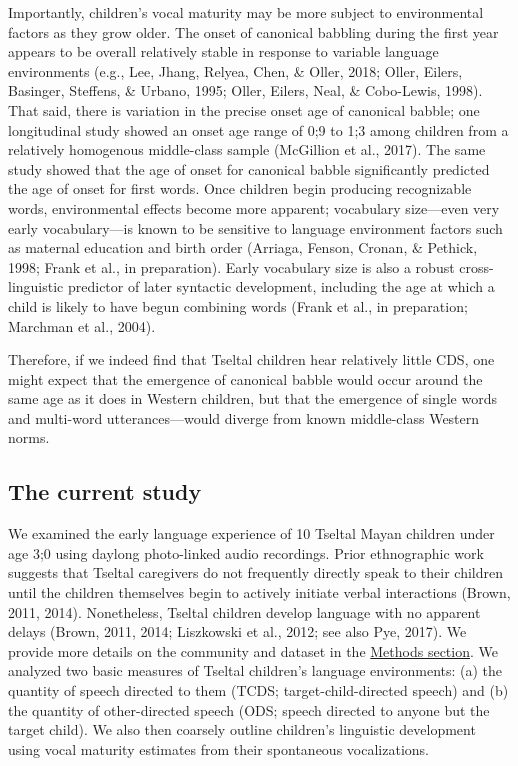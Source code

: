 \documentclass[floatsintext,man]{apa6}
\theoremstyle{definition}
\theoremstyle{definition}
\theoremstyle{definition}
\theoremstyle{remark}
\begin{document}
Importantly, children's vocal maturity may be more subject to
environmental factors as they grow older. The onset of canonical
babbling during the first year appears to be overall relatively stable
in response to variable language environments (e.g., Lee, Jhang, Relyea,
Chen, \& Oller, 2018; Oller, Eilers, Basinger, Steffens, \& Urbano,
1995; Oller, Eilers, Neal, \& Cobo-Lewis, 1998). That said, there is
variation in the precise onset age of canonical babble; one longitudinal
study showed an onset age range of 0;9 to 1;3 among children from a
relatively homogenous middle-class sample (McGillion et al., 2017). The
same study showed that the age of onset for canonical babble
significantly predicted the age of onset for first words. Once children
begin producing recognizable words, environmental effects become more
apparent; vocabulary size---even very early vocabulary---is known to be
sensitive to language environment factors such as maternal education and
birth order (Arriaga, Fenson, Cronan, \& Pethick, 1998; Frank et al., in
preparation). Early vocabulary size is also a robust cross-linguistic
predictor of later syntactic development, including the age at which a
child is likely to have begun combining words (Frank et al., in
preparation; Marchman et al., 2004).

Therefore, if we indeed find that Tseltal children hear relatively
little CDS, one might expect that the emergence of canonical babble
would occur around the same age as it does in Western children, but that
the emergence of single words and multi-word utterances---would diverge
from known middle-class Western norms.

\subsection{The current study}\label{intro-currentstudy}

We examined the early language experience of 10 Tseltal Mayan children
under age 3;0 using daylong photo-linked audio recordings. Prior
ethnographic work suggests that Tseltal caregivers do not frequently
directly speak to their children until the children themselves begin to
actively initiate verbal interactions (Brown, 2011, 2014). Nonetheless,
Tseltal children develop language with no apparent delays (Brown, 2011,
2014; Liszkowski et al., 2012; see also Pye, 2017). We provide more
details on the community and dataset in the
\protect\hyperlink{methods}{Methods section}. We analyzed two basic
measures of Tseltal children's language environments: (a) the quantity
of speech directed to them (TCDS; target-child-directed speech) and (b)
the quantity of other-directed speech (ODS; speech directed to anyone
but the target child). We also then coarsely outline children's
linguistic development using vocal maturity estimates from their
spontaneous vocalizations.
\end{document}
